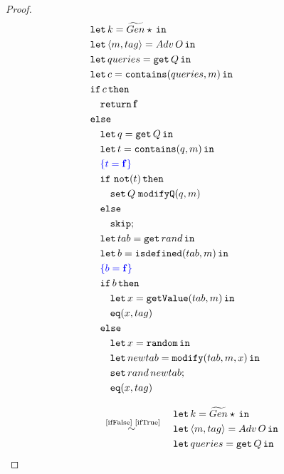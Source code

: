 \begin{proof}
\footnotesize{
\begin{align*}
&\begin{aligned}
    &\letin{k = \widetilde{Gen} \star}{} \\
    &\letin{\lis{m,tag} = Adv\,O}{} \\
    &\letin{queries = \get Q}{} \\
    &\letin{c=\mathtt{contains}(queries, m)}{} \\
    & \mathtt{if}\, c\, \mathtt{then} \\
    &\quad \return \false \\
    &\mathtt{else} \\
    &\quad\letin{q=\get Q}{} \\
    &\quad\letin{t=\mathtt{contains}(q,m)}{} \\
    &\quad \color{blue} \{ t = \false \} \\
    &\quad \mathtt{if}\ \mathtt{not}(t)\,\mathtt{then} \\
    &\quad\quad \mathtt{set}\,Q\;\mathtt{modifyQ}(q, m) \\
    &\quad \mathtt{else} \\ 
    &\qquad \mathtt{skip}; \\
    &\quad\letin{tab = \mathtt{get}\,rand}{} \\
    &\quad\letin{b = \mathtt{isdefined}(tab, m)}{} \\
    &\quad  \color{blue} \{ b = \false \} \\
    &\quad\mathtt{if}\, b\, \mathtt{then} \\
    &\quad\quad \letin{x = \mathtt{getValue}(tab, m)}{} \\
    &\quad\quad \mathtt{eq}(x,tag) \\
    &\quad\mathtt{else} \\
    &\quad\quad \letin{x = \random}{} \\
    &\quad\quad \letin{newtab = \mathtt{modify}(tab, m, x)}{} \\
    &\quad\quad \mathtt{set}\,rand\,newtab; \\
    &\quad\quad \mathtt{eq}(x,tag)
\end{aligned}
\\[2ex]
&\quad\overset{\text{~\ref{ifFalse}~\ref{ifTrue}}}{\sim}\quad
\begin{aligned}
    &\letin{k = \widetilde{Gen} \star}{} \\
    &\letin{\lis{m,tag} = Adv\,O}{} \\
    &\letin{queries = \get Q}{} \\

\end{aligned}
\end{align*}}
\end{proof}
